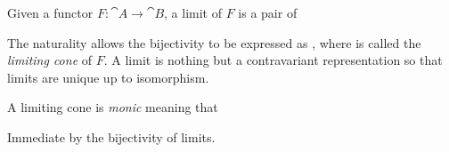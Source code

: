 \begin{definition}[Limit]
Given a functor $F : \cat A \to \cat B$, a limit of $F$ is a pair of
\end{definition}
The naturality allows the bijectivity to be expressed as
, where \! is called the \emph{limiting cone} of $F$.
\mynewline
A limit is nothing but a contravariant representation
so that limits are unique up to isomorphism.
\begin{proposition}\label{l.c.m}
A limiting cone is \emph{monic} meaning that
\end{proposition}
\begin{strdproof}
Immediate by the bijectivity of limits.
\end{strdproof}


